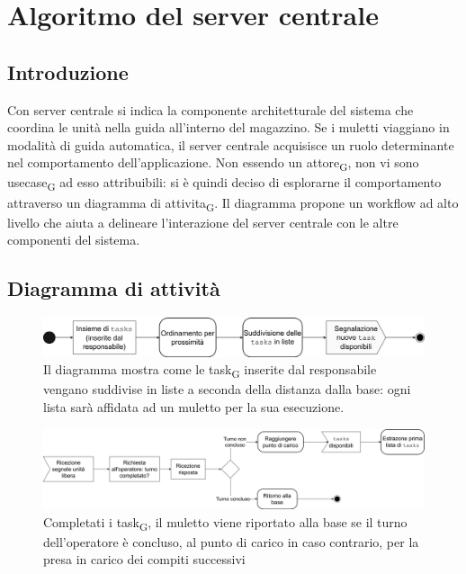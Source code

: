 \section{Algoritmo del server centrale}
\subsection{Introduzione}
Con server centrale si indica la componente architetturale del sistema che coordina le unità nella guida all'interno del magazzino. Se i muletti viaggiano in modalità di guida automatica, il server centrale acquisisce un ruolo determinante nel comportamento dell'applicazione. Non essendo un attore\textsubscript{G}, non vi sono usecase\textsubscript{G} ad esso attribuibili: si è quindi deciso di esplorarne il comportamento attraverso un diagramma di attivita\textsubscript{G}. Il diagramma propone un workflow ad alto livello che aiuta a delineare l'interazione del server centrale con le altre componenti del sistema.



\subsection{Diagramma di attività}

\begin{figure}[H]
	\centering
	\includegraphics[scale=0.35]{res/images/diagramma_di_attivita3.png}
	\caption[Diagramma di attivita\textsubscript{G} per l'ordinamento  delle tasks]{Il diagramma mostra come le task\textsubscript{G} inserite dal responsabile vengano suddivise in liste a seconda della distanza dalla base: ogni lista sarà affidata ad un muletto per la sua esecuzione.}
\end{figure}

\begin{figure}[H]
	\centering
	\includegraphics[scale=0.35]{res/images/diagramma_di_attivita1.png}
	\caption[Diagramma di attivita\textsubscript{G} per la gestione del muletto dopo il completamento della lista di tasks]{Completati i task\textsubscript{G}, il muletto viene riportato alla base se il turno dell'operatore è concluso, al punto di carico in caso contrario, per la presa in carico dei compiti successivi}
\end{figure}



